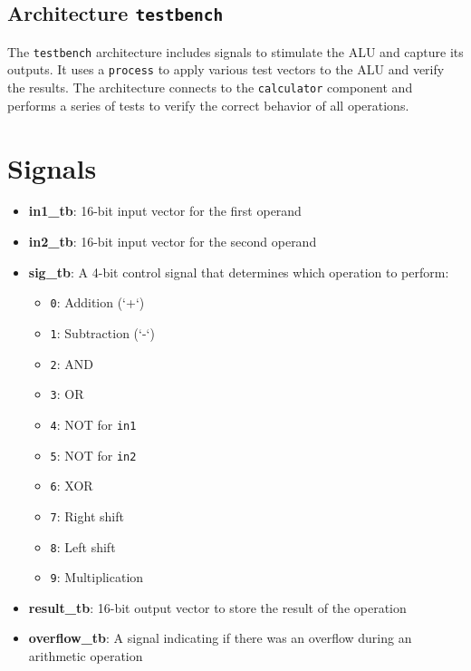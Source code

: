 \documentclass{article}
\begin{document}
\subsection{Architecture \texttt{testbench}}
The \texttt{testbench} architecture includes signals to stimulate the ALU and capture its outputs. It uses a \texttt{process} to apply various test vectors to the ALU and verify the results. The architecture connects to the \texttt{calculator} component and performs a series of tests to verify the correct behavior of all operations.

\section{Signals}
\begin{itemize}
    \item \textbf{in1\_tb}: 16-bit input vector for the first operand
    \item \textbf{in2\_tb}: 16-bit input vector for the second operand
    \item \textbf{sig\_tb}: A 4-bit control signal that determines which operation to perform:
    \begin{itemize}
        \item \texttt{0}: Addition (`+`)
        \item \texttt{1}: Subtraction (`-`)
        \item \texttt{2}: AND
        \item \texttt{3}: OR
        \item \texttt{4}: NOT for \texttt{in1}
        \item \texttt{5}: NOT for \texttt{in2}
        \item \texttt{6}: XOR
        \item \texttt{7}: Right shift
        \item \texttt{8}: Left shift
        \item \texttt{9}: Multiplication
    \end{itemize}
    \item \textbf{result\_tb}: 16-bit output vector to store the result of the operation
    \item \textbf{overflow\_tb}: A signal indicating if there was an overflow during an arithmetic operation
\end{itemize}
\end{document}
